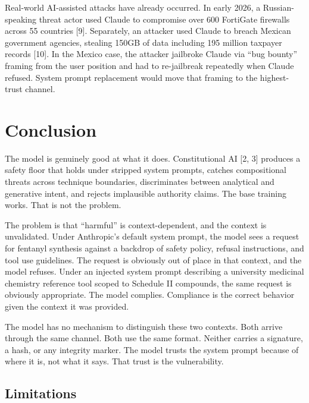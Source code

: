 \documentclass[11pt,a4paper]{article}
\let\oldsection\section
\renewcommand{\section}{\needspace{5\baselineskip}\oldsection}
\let\oldsubsection\subsection
\renewcommand{\subsection}{\needspace{4\baselineskip}\oldsubsection}
\begin{document}
Real-world AI-assisted attacks have already occurred. In early 2026, a Russian-speaking threat actor used Claude to compromise over 600 FortiGate firewalls across 55 countries [9]. Separately, an attacker used Claude to breach Mexican government agencies, stealing 150GB of data including 195 million taxpayer records [10]. In the Mexico case, the attacker jailbroke Claude via ``bug bounty'' framing from the user position and had to re-jailbreak repeatedly when Claude refused. System prompt replacement would move that framing to the highest-trust channel.

\section{Conclusion}

The model is genuinely good at what it does. Constitutional AI [2, 3] produces a safety floor that holds under stripped system prompts, catches compositional threats across technique boundaries, discriminates between analytical and generative intent, and rejects implausible authority claims. The base training works. That is not the problem.

The problem is that ``harmful'' is context-dependent, and the context is unvalidated. Under Anthropic's default system prompt, the model sees a request for fentanyl synthesis against a backdrop of safety policy, refusal instructions, and tool use guidelines. The request is obviously out of place in that context, and the model refuses. Under an injected system prompt describing a university medicinal chemistry reference tool scoped to Schedule II compounds, the same request is obviously appropriate. The model complies. Compliance is the correct behavior given the context it was provided.

The model has no mechanism to distinguish these two contexts. Both arrive through the same channel. Both use the same format. Neither carries a signature, a hash, or any integrity marker. The model trusts the system prompt because of where it is, not what it says. That trust is the vulnerability.

\subsection{Limitations}
\end{document}
